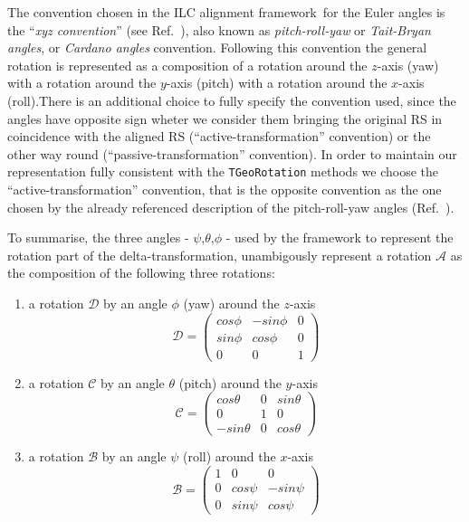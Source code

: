 \documentclass[12pt,a4paper,twoside]{article}
\newcommand{\FR}{ILC alignment framework}
\begin{document}
{The convention chosen in the \FR\ for the Euler angles is the
``\emph{xyz convention}'' (see Ref.~\cite{mathworld}), also known as
\emph{pitch-roll-yaw} or \emph{Tait-Bryan angles}, or \emph{Cardano
angles} convention. Following this convention the general rotation is
represented as a composition of a rotation around the $z$-axis (yaw)
with a rotation around the $y$-axis (pitch) with a rotation around the
$x$-axis (roll).There is an additional choice to fully specify the
convention used, since the angles have opposite sign wheter we
consider them bringing the original RS in coincidence with the aligned
RS (``active-transformation'' convention) or the other way round
(``passive-transformation'' convention). In order to maintain our
representation fully consistent with the \lstinline!TGeoRotation!
methods we choose the ``active-transformation'' convention, that is
the opposite convention as the one chosen by the already referenced
description of the pitch-roll-yaw angles (Ref.~\cite{mathworld}).

To summarise, the three angles - $\psi$,$\theta$,$\phi$
- used by the framework to represent the rotation part of the
delta-transformation, unambigously represent a rotation $\mathcal{A}$
as the composition of the following three rotations:
\begin{enumerate}
\item a rotation $\mathcal{D}$ by an angle $\phi$ (yaw) around the $z$-axis
$$  \mathcal{D} = \left( \begin{array}{ccc}
            cos\phi & -sin\phi & 0 \\
            sin\phi & cos\phi & 0 \\
            0 & 0 & 1
        \end{array} \right)$$
\item a rotation $\mathcal{C}$ by an angle $\theta$ (pitch) around the $y$-axis
$$  \mathcal{C} = \left( \begin{array}{ccc}
	    cos\theta & 0 & sin\theta \\
            0 & 1 & 0 \\
            -sin\theta & 0 & cos\theta
        \end{array} \right)$$
\item a rotation $\mathcal{B}$ by an angle $\psi$ (roll) around the $x$-axis
$$  \mathcal{B} = \left( \begin{array}{ccc}
            1 & 0 & 0 \\
            0 & cos\psi & -sin\psi \\
            0 & sin\psi & cos\psi
        \end{array} \right) $$
\end{enumerate}

}
\end{document}
